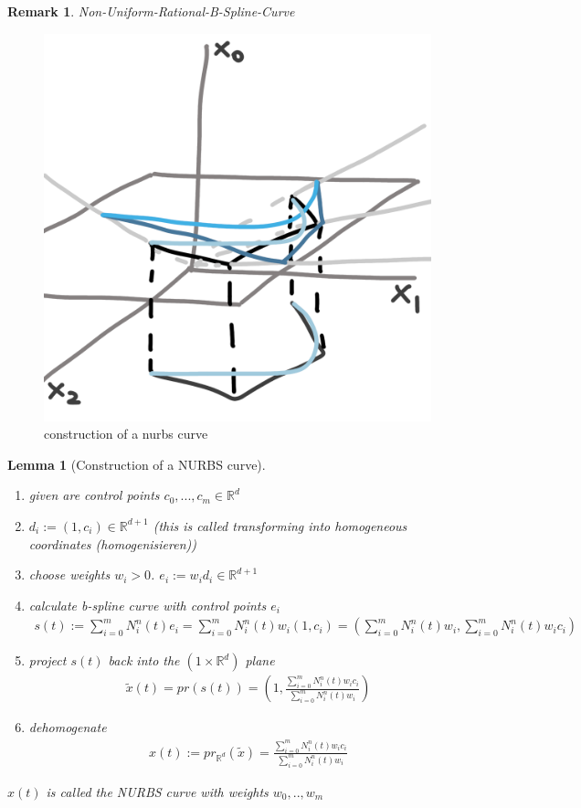 \documentclass[]{article}
\newtheorem{lemma}{Lemma}
\newtheorem{remark}{Remark}
\begin{document}
\begin{remark}
	Non-Uniform-Rational-B-Spline-Curve
\end{remark}

\begin{figure}[h!]
	\centering
	\includegraphics[width=0.3\linewidth]{figures/nurbs_construction}
	\caption{construction of a nurbs curve}
	\label{fig:nurbs_construction}
\end{figure}

\begin{lemma}[Construction of a NURBS curve]
	\begin{enumerate}
		\item given are control points $c_0, ..., c_m \in \mathbb{R}^d$
		\item $d_i := (1, c_i) \in \mathbb{R}^{d+1}$ (this is called transforming into homogeneous coordinates (homogenisieren))
		\item choose weights $w_i > 0$. $e_i := w_i d_i \in \mathbb{R}^{d+1}$
		\item calculate b-spline curve with control points $e_i$
		\begin{align*}
			s(t) := \sum_{i=0}^{m} N_i^n(t) e_i = \sum_{i=0}^{m} N_i^n(t) w_i (1,c_i) = \left(\sum_{i=0}^{m} N_i^n(t) w_i, \sum_{i=0}^{m} N_i^n(t) w_i c_i\right)
		\end{align*}
		\item project $s(t)$ back into the $(1 \times \mathbb{R}^d)$ plane
		\begin{align*}
			\tilde{x}(t) = pr(s(t)) = \left(1, \frac{\sum_{i=0}^{m} N_i^n(t) w_i c_i}{\sum_{i=0}^{m} N_i^n(t) w_i}\right)
		\end{align*}
		\item dehomogenate
		\begin{align*}
			x(t) := pr_{\mathbb{R}^d}(\tilde{x}) = \frac{\sum_{i=0}^{m} N_i^n(t) w_i c_i}{\sum_{i=0}^{m} N_i^n(t) w_i}
		\end{align*}
	\end{enumerate}
	
	$x(t)$ is called the NURBS curve with weights $w_0, .., w_m$
\end{lemma}
\end{document}
